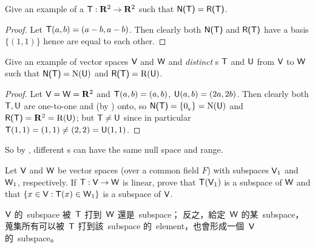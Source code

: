 \begin{exercise} \label{exercise 2.1.18}
Give an example of a \LTRAN{} \(\textsf{T}: \mathbf{R}^2 \to \mathbf{R}^2\) such that \(\textsf{N(T)} = \textsf{R(T)}\).
\end{exercise}

\begin{proof}
Let \(\textsf{T}(a, b) = (a - b, a - b)\).
Then clearly both \(\textsf{N(T)}\) and \(\textsf{R(T)}\) have a basis \(\{ (1, 1) \}\) hence are equal to each other.
\end{proof}

\begin{exercise} \label{exercise 2.1.19}
Give an example of vector spaces \(\textsf{V}\) and \(\textsf{W}\) and \emph{distinct} \LTRAN{}s \(\textsf{T}\) and \(\textsf{U}\) from \(\textsf{V}\) to \(\textsf{W}\) such that \(\textsf{N(T)} = \mathrm{N}(\textsf{U})\) and \(\textsf{R(T)} = \mathrm{R}(\textsf{U})\).
\end{exercise}

\begin{proof}
Let \(\textsf{V} = \textsf{W} = \mathbf{R}^2\) and \(\textsf{T}(a, b) = (a, b)\), \(\textsf{U}(a, b) = (2a, 2b)\).
Then clearly both \(\textsf{T}, \textsf{U}\) are one-to-one and (by ) onto, so \(\textsf{N(T)} = \{ 0_{_{\textsf{V}}} \} = \mathrm{N}(\textsf{U})\) and \(\textsf{R(T)} = \mathbf{R}^2 = \mathrm{R}(\textsf{U})\);
but \(\textsf{T} \ne \textsf{U}\) since in particular \(\textsf{T}(1, 1) = (1, 1) \ne (2, 2) = \textsf{U}(1, 1)\).
\end{proof}

\begin{note}
So by , different \LTRAN{}s can have the same null space and range.
\end{note}

\begin{exercise} \label{exercise 2.1.20}
Let \(\textsf{V}\) and \(\textsf{W}\) be vector spaces (over a common field \(F\)) with subspaces \(\textsf{V}_1\) and \(\textsf{W}_1\), respectively.
If \(\textsf{T} : \textsf{V} \to \textsf{W}\) is linear, prove that \(\textsf{T}(\textsf{V}_1)\) is a subspace of \(\textsf{W}\) and that \(\{ x \in \textsf{V}: \textsf{T}(x) \in \textsf{W}_1 \}\) is a subspace of \(\textsf{V}\).
\end{exercise}

\begin{note}
\(\textsf{V}\) 的\ subspace 被\ \(\textsf{T}\) 打到\ \(\textsf{W}\) 還是\ subspace；
反之，給定\ \(\textsf{W}\) 的某\ subspace，蒐集所有可以被\ \(\textsf{T}\) 打到該\ subspace 的\ element，也會形成一個\ \(\textsf{V}\) 的\ subspace。
\end{note}

